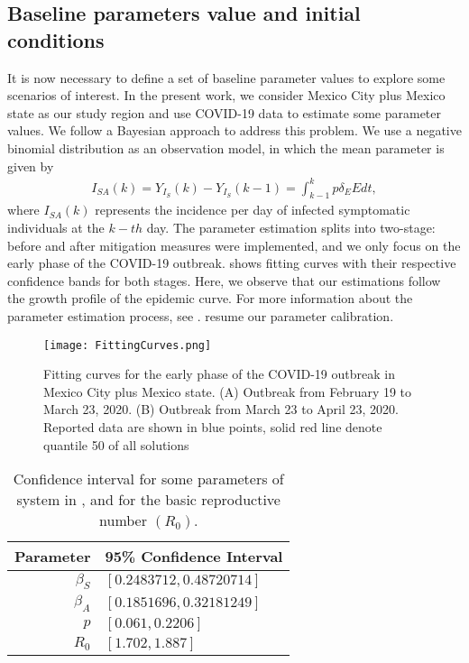 \subsection{Baseline parameters value and initial conditions}
It is now necessary to define a set of baseline parameter
values to explore some scenarios of interest. In the present work,
we consider Mexico City plus Mexico state as our study region and use
COVID-19 data to estimate some parameter values. We follow a Bayesian
approach to address this problem. We use a negative binomial
distribution as an observation model, in which the mean parameter
is given by
\begin{equation*}\label{incidence}
    \begin{aligned}
        I_{SA}(k) = Y_{I_S}(k) - Y_{I_S}(k-1)=\int_{k-1}^k p\delta_EE dt,
    \end{aligned}
\end{equation*}
where $I_{SA}(k)$ represents the incidence per day of
infected symptomatic individuals at the $k-th$ day.
The parameter estimation splits into two-stage:
before and after mitigation measures were implemented,
and we only focus on the early phase of the COVID-19 outbreak.
 shows fitting curves with their respective
confidence bands for both stages. Here, we observe that our estimations
follow the growth profile of the epidemic curve. For more information about
the parameter estimation process, see .
 resume our parameter calibration.
%
\begin{figure*}[tbh]
    \centering
    \texttt{[image: FittingCurves.png]}
    \caption{
        Fitting curves for the early phase of the COVID-19
        outbreak in Mexico City plus Mexico state.
        (A) Outbreak from February 19 to March 23, 2020.
        (B) Outbreak from March 23 to April 23, 2020.
        Reported data are shown in blue points, solid red line
        denote quantile 50 of all solutions
    }
    \label{Fig:fittingcurve}
\end{figure*}
%
\begin{table}[bth]
    \begin{center}
        \begin{tabular}{rl}
            \toprule
            Parameter & 95\% Confidence Interval
            \\
            \midrule
            $\beta_S$ & $[\num{0.2483712}, \num{0.48720714}]$ \\
            $\beta_A$ & $[\num{0.1851696}, \num{0.32181249}]$ \\
            $p$       & $[\num{0.061}, \num{0.2206}]$ \\
            $R_0$     & $[\num{1.702}, \num{1.887}]$\\
            \bottomrule
        \end{tabular}
        \caption{%
            Confidence interval for some parameters of system in
            , and for the basic reproductive number
            $(R_0)$.
        }\label{table_icparam4}
    \end{center}
\end{table}
